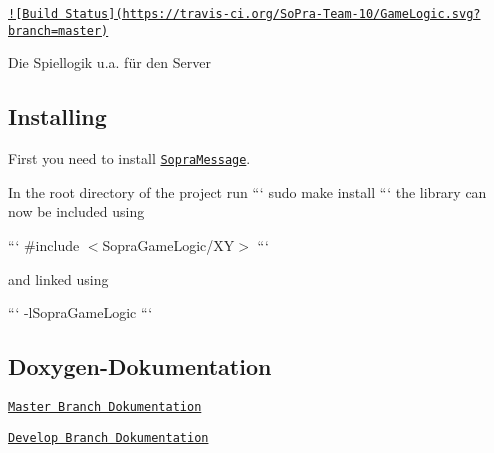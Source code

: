 \href{https://travis-ci.org/SoPra-Team-10/GameLogic}{\tt !\mbox{[}Build Status\mbox{]}(https\-://travis-\/ci.\-org/\-So\-Pra-\/\-Team-\/10/\-Game\-Logic.\-svg?branch=master)}

Die Spiellogik u.\-a. für den Server

\subsection*{Installing}

First you need to install \href{https://github.com/SoPra-Team-10/Messages}{\tt Sopra\-Message}.

In the root directory of the project run ``` sudo make install ``` the library can now be included using

``` \#include $<$Sopra\-Game\-Logic/\-X\-Y$>$ ```

and linked using

``` -\/l\-Sopra\-Game\-Logic ```

\subsection*{Doxygen-\/\-Dokumentation}


\begin{DoxyItemize}
\item \href{https://sopra-team-10.github.io/GameLogic/master/html/index.html}{\tt Master Branch Dokumentation}
\item \href{https://sopra-team-10.github.io/GameLogic/Develop/html/index.html}{\tt Develop Branch Dokumentation} 
\end{DoxyItemize}